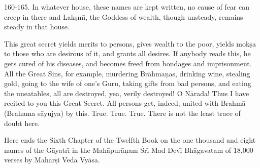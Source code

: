 160-165. In whatever house, these names are kept written, no cause of fear can creep in there and Lak\d{s}m\={\i}, the Goddess of wealth, though unsteady, remains steady in that house.

This great secret yields merits to persons, gives wealth to the poor, yields mok\d{s}a to those who are desirous of it, and grants all desires. If anybody reads this, he gets cured of his diseases, and becomes freed from bondages and imprisonment. All the Great Sins, for example, murdering Br\=ahma\d{n}as, drinking wine, stealing gold, going to the wife of one's Guru, taking gifts from bad persons, and eating the uneatables, all are destroyed, yea, verily destroyed! O N\=arada! Thus I have recited to you this Great Secret. All persons get, indeed, united with Brahm\=a (Brahama s\=ayujya) by this. True. True. True. There is not the least trace of doubt here.

Here ends the Sixth Chapter of the Twelfth Book on the one thousand and eight names of the G\=ayatr\={\i} in the Mah\=apur\=a\d{n}am \'Sr\={\i} Mad Dev\={\i} Bh\=agavatam of 18,000 verses by Mahar\d{s}i Veda Vy\=asa.



